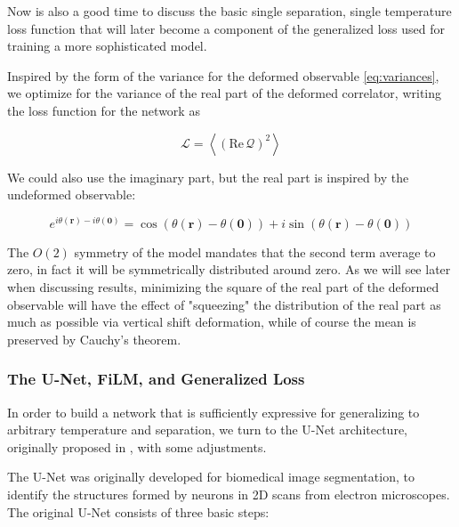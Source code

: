 \documentclass[12pt]{article}
\begin{document}
Now is also a good time to discuss the basic single separation, single temperature loss function that will later become a component of the
generalized loss used for training a more sophisticated model. 

Inspired by the form of the variance for the deformed observable \ref{eq:variances}, we optimize for the variance of the real part of the 
deformed correlator, writing the loss function for the network as 

\begin{equation} \label{eq:loss}
	\mathcal{L} = \left\langle \left( \mathrm{Re}\, \mathcal{Q} \right)^2 \right\rangle
\end{equation}

We could also use the imaginary part, but the real part is inspired by the undeformed observable:

\begin{equation*}
	e^{i\theta(\mathbf{r})-i\theta(\mathbf{0})} = \cos\left(\theta(\mathbf{r}) - \theta(\mathbf{0})\right) + i\sin\left(\theta(\mathbf{r}) - \theta(\mathbf{0})\right)
\end{equation*}

The $O(2)$ symmetry of the model mandates that the second term average to zero, in fact it will be symmetrically distributed around zero.
As we will see later when discussing results, minimizing the square of the real part of the deformed observable will have the effect of "squeezing" the distribution of the real part
as much as possible via vertical shift deformation, while of course the mean is preserved by Cauchy's theorem.

\subsubsection{The U-Net, FiLM, and Generalized Loss}

In order to build a network that is sufficiently expressive for generalizing to arbitrary temperature and separation, we turn to the 
U-Net architecture, originally proposed in \cite{ronneberger2015unetconvolutionalnetworksbiomedical}, with some adjustments.

The U-Net was originally developed for biomedical image segmentation, to identify the structures formed by neurons in 
2D scans from electron microscopes. The original U-Net consists of three basic steps:
\end{document}
